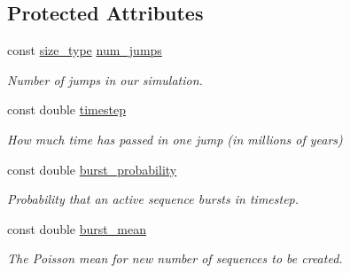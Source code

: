 \subsection*{Protected Attributes}
\begin{DoxyCompactItemize}
\item 
\mbox{\label{classretrocombinator_1_1Evolution_a043c016f93a961d0e3a2fc9d257b01d9}} 
const \hyperlink{constants_8h_a8e1541b50cee66a791df4c437ccbb385}{size\+\_\+type} \hyperlink{classretrocombinator_1_1Evolution_a043c016f93a961d0e3a2fc9d257b01d9}{num\+\_\+jumps}
\begin{DoxyCompactList}\small\item\em Number of jumps in our simulation. \end{DoxyCompactList}\item 
\mbox{\label{classretrocombinator_1_1Evolution_afdb375b975d48d9915c6e8337c33a175}} 
const double \hyperlink{classretrocombinator_1_1Evolution_afdb375b975d48d9915c6e8337c33a175}{timestep}
\begin{DoxyCompactList}\small\item\em How much time has passed in one jump (in millions of years) \end{DoxyCompactList}\item 
\mbox{\label{classretrocombinator_1_1Evolution_afb663b25070c1ca619e682cef2a32196}} 
const double \hyperlink{classretrocombinator_1_1Evolution_afb663b25070c1ca619e682cef2a32196}{burst\+\_\+probability}
\begin{DoxyCompactList}\small\item\em Probability that an active sequence bursts in {\itshape timestep}. \end{DoxyCompactList}\item 
\mbox{\label{classretrocombinator_1_1Evolution_ac2f4821269c08b23f21b5333f2067e5f}} 
const double \hyperlink{classretrocombinator_1_1Evolution_ac2f4821269c08b23f21b5333f2067e5f}{burst\+\_\+mean}
\begin{DoxyCompactList}\small\item\em The Poisson mean for new number of sequences to be created. \end{DoxyCompactList}\item 

\end{DoxyCompactItemize}

